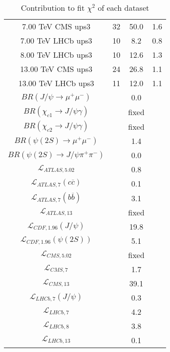 \begin{table}[h!]
\begin{tabular}{c|c|c|c}
7.00 TeV CMS ups3 & 32 & 50.0 & 1.6 \\
7.00 TeV LHCb ups3 & 10 & 8.2 & 0.8 \\
8.00 TeV LHCb ups3 & 10 & 12.6 & 1.3 \\
13.00 TeV CMS ups3 & 24 & 26.8 & 1.1 \\
13.00 TeV LHCb ups3 & 11 & 12.0 & 1.1 \\
\hline
$BR(J/\psi\rightarrow\mu^+\mu^-)$ &  & 0.0 &  \\
$BR(\chi_{c1}\rightarrow J/\psi\gamma)$ &  & fixed & \\
$BR(\chi_{c2}\rightarrow J/\psi\gamma)$ &  & fixed & \\
$BR(\psi(2S)\rightarrow\mu^+\mu^-)$ &  & 1.4 &  \\
$BR(\psi(2S)\rightarrow J/\psi\pi^+\pi^-)$ &  & 0.0 &  \\
$\mathcal L_{ATLAS,5.02}$ &  & 0.8 &  \\
$\mathcal L_{ATLAS,7}(c\overline c)$ &  & 0.1 &  \\
$\mathcal L_{ATLAS,7}(b\overline b)$ &  & 3.1 &  \\
$\mathcal L_{ATLAS,13}$ &  & fixed & \\
$\mathcal L_{CDF,1.96}(J/\psi)$ &  & 19.8 &  \\
$\mathcal L_{CDF,1.96}(\psi(2S))$ &  & 5.1 &  \\
$\mathcal L_{CMS,5.02}$ &  & fixed & \\
$\mathcal L_{CMS,7}$ &  & 1.7 &  \\
$\mathcal L_{CMS,13}$ &  & 39.1 &  \\
$\mathcal L_{LHCb,7}(J/\psi)$ &  & 0.3 &  \\
$\mathcal L_{LHCb,7}$ &  & 4.2 &  \\
$\mathcal L_{LHCb,8}$ &  & 3.8 &  \\
$\mathcal L_{LHCb,13}$ &  & 0.1 &  \\
\end{tabular}
\caption{Contribution to fit $\chi^2$ of each dataset}
\end{table}
